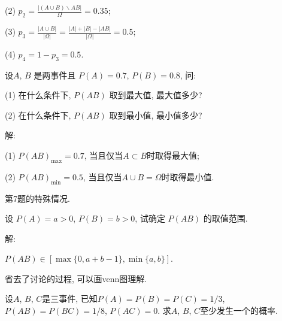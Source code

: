 \documentclass[standard]{ExBook}
\begin{document}
\begin{qitems}
\begin{bbox}
(2) $p_{2}=\frac{|(A\cup B)\backslash AB|}{\Omega}=0.35$;

(3) $p_{3}=\frac{|A\cup B|}{|\Omega|}=\frac{|A|+|B|-|AB|}{|\Omega|}=0.5$;

(4) $p_{4}=1-p_{3}=0.5$.
    \end{bbox}

\vspace{-5em}

    \begin{bbox}
    \begin{shaded}
        \qitem
设$A$, $B$ 是两事件且 $P(A) = 0.7$, $P(B) = 0.8$, 问: 

(1) 在什么条件下, $P(AB)$ 取到最大值, 最大值多少? 

(2) 在什么条件下, $P(AB)$ 取到最小值, 最小值多少?
    \end{shaded}
    \end{bbox}

\vspace{-5em}

    \begin{bbox}
解:

(1) $P(AB)_{\max}=0.7$, 当且仅当$A\subset B$时取得最大值;

(2) $P(AB)_{\min}=0.5$, 当且仅当$A\cup B=\Omega$时取得最小值.

\textcolor{themeColor}{\selectfont {} 第7题的特殊情况.}
    \end{bbox}

\vspace{-5em}

    \begin{bbox}
    \begin{shaded}
        \qitem
设 $P(A) = a > 0$, $P(B) = b > 0$, 试确定 $P(AB)$ 的取值范围.
    \end{shaded}
    \end{bbox}

\vspace{-5em}

    \begin{bbox}
解:

$P(AB)\in[\max\{0,a+b-1\},\min\{a,b\}]$.

\textcolor{themeColor}{\selectfont {} 省去了讨论的过程, 可以画venn图理解.}
    \end{bbox}

\vspace{-5em}

    \begin{bbox}
    \begin{shaded}
        \qitem
设$A$, $B$, $C$是三事件, 已知$P(A) = P(B) = P(C) = 1/3$, $P(AB) = P(BC) = 1/8$, $P(AC) = 0$. 求$A$, $B$, $C$至少发生一个的概率.
    \end{shaded}
    \end{bbox}


\end{qitems}
\end{document}
